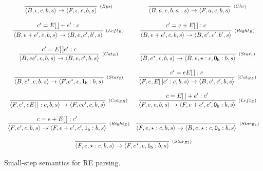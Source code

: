 \documentclass[oneside,12pt]{scrbook}
\theoremstyle{definition}
\newcommand{\C}[1]{\red{\mathsf{#1}}}
\newcommand{\conf}[1]{\ensuremath{\langle #1 \rangle}}
\theoremstyle{plain}
\theoremstyle{definition}
\begin{document}
\begin{figure}[h]
	\[
	\begin{array}{cc}
	\infer[_{(Eps)}]{\conf{B,\epsilon,c,b,s} \to \conf{F,\epsilon,c,b,s}}{}
	&
	\infer[_{(Chr)}]{\conf{B,a,c,b,a:s} \to \conf{F,a,c,b,s}}{}
	
	\\ \\
	\infer[_{(Left_B)}]{\conf{B,e+e',c,b,s}\to\conf{B,e,c',b',s}}
	{\begin{array}{c}
		c' = E[\,]+e' : c \\
		\end{array}}
	&
	\infer[_{(Right_B)}]{\conf{B,e+e',c,b,s}\to\conf{B,e',c',b',s}}
	{\begin{array}{c}
		c' = e + E[\,] : c \\
		\end{array}}
	
	\\ \\
	\infer[_{(Cat_B)}]{\conf{B,ee',c,b,s}\to\conf{B,e,c',b,s}}
	{c' = E[\,]e' : c}
	&
	\infer[_{(Star_1)}]{\conf{B,e^\star,c,b,s}\to\conf{B,e,\star : c, \ensuremath{\C{0_b}} : b, s}}{}
	
	\\ \\
	\infer[_{(Star_2)}]{\conf{B,e^\star,c,b,s}\to\conf{F,e^\star, c, \ensuremath{\C{1_b}} : b, s}}{}
	&
	\infer[_{(Cat_{EL})}]{\conf{F,e,E[\,]e':c,b,s}\to\conf{B,e',c',b,s}}{c'=eE[\,]:c}
	
	\\ \\
	\infer[_{(Cat_{ER})}]{\conf{F,e',eE[\,]:c,b,s}\to\conf{F,ee',c,b,s}}{}
	&
	\infer[_{(Left_E)}]{\conf{F,e,c,b,s}\to\conf{F,e+e',c',\ensuremath{\C{0_b}}:b,s}}{c = E[\,]+e' : c'}
	
	\\ \\
	
	\infer[_{(Right_E)}]{\conf{F,e',c,b,s}\to\conf{F,e+e',c',\ensuremath{\C{1_b}}:b,s}}{c = e + E[\,] : c'}
	&
	\infer[_{(Star_{E1})}]{\conf{F,e,\star:c,b,s}\to\conf{B,e,\star:c,\ensuremath{\C{0_b}}:b,s}}{}
	
	\\ \\
	
	\multicolumn{2}{c}{
		
		\begin{array}{c}
		\infer[_{(Star_{E2})}]{\conf{F,e,\star:c,b,s}\to\conf{F,e^\star,c,\ensuremath{\C{1_b}}:b,s}}{}
		\end{array}
		
	}
	\end{array}
	\]
	\centering
	\caption{Small-step semantics for RE parsing.}
	\label{figure:smallstep}
\end{figure}
\end{document}
